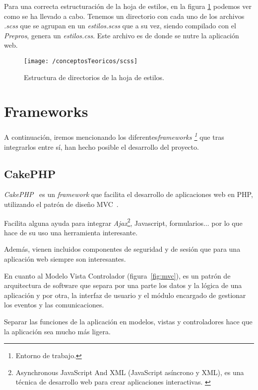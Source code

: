 Para una correcta estructuración de la hoja de estilos, en la figura \ref{fig:scss} podemos ver como se ha llevado a cabo.
Tenemos un directorio con cada uno de los archivos \textit{.scss} que se agrupan en un \textit{estilos.scss} que a su vez, siendo compilado con el \textit{Prepros}, genera un \textit{estilos.css}. Este archivo es de donde se nutre la aplicación web.

\begin{figure}[ht]
	\centering
	\texttt{[image: /conceptosTeoricos/scss]}
	\caption{Estructura de directorios de la hoja de estilos.}
	\label{fig:scss}
\end{figure}

\newpage

\section{Frameworks }

A continuación, iremos mencionando los diferentes\textit{frameworks \footnote{Entorno de trabajo.}} que tras integrarlos entre sí, han hecho posible el desarrollo del proyecto.

\subsection{CakePHP}

\textit{CakePHP}~\cite{web:cakephp} es un \textit{framework} que facilita el desarrollo de aplicaciones web en PHP, utilizando el patrón de diseño MVC~\cite{wiki:cakephp}.

Facilita alguna ayuda para integrar \textit{Ajax}\footnote{Asynchronous JavaScript And XML (JavaScript asíncrono y XML), es una técnica de desarrollo web para crear aplicaciones interactivas. \cite{wiki:ajax}}, Javascript, formularios... por lo que hace de su uso una herramienta interesante.

Además, vienen incluidos componentes de seguridad y de sesión que para una aplicación web siempre son interesantes.

En cuanto al Modelo Vista Controlador (figura~\ref{fig:mvc}), es un patrón de arquitectura de software que separa por una parte los datos y la lógica de una aplicación y por otra, la interfaz de usuario y el módulo encargado de gestionar los eventos y las comunicaciones. 

Separar las funciones de la aplicación en modelos, vistas y controladores hace que la aplicación sea mucho más ligera.

